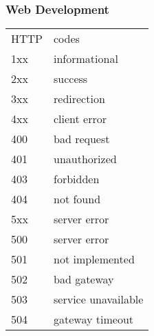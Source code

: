 
\subsubsection*{Web Development}
\begin{tabular}{ll}
HTTP&codes\\
1xx&informational\\
2xx&success\\
3xx&redirection\\
4xx&client error\\
400&bad request\\
401&unauthorized\\
403&forbidden\\
404&not found\\
5xx&server error\\
500&server error\\
501&not implemented\\
502&bad gateway\\
503&service unavailable\\
504&gateway timeout\\
\end{tabular}

